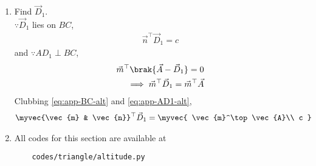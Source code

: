 \begin{enumerate}[label=\thesubsection.\arabic*.,ref=\thesubsection.\theenumi]
  \item Find $\vec{D}_1$.
	  \\
		\solution $\because \vec{D}_1$ lies on $BC$, 
\begin{align}
			\label{eq:app-BC-alt}
\vec{n}^\top\vec{D}_1 =c
\end{align}
and 
	$\because AD_1 \perp BC$,
\begin{align}
	\vec{m}^{\top}\brak{\vec{A}-\vec{D}_1} = 0
	\\
	\implies 
	\vec{m}^{\top}\vec{D}_1 = 
	\vec{m}^{\top}\vec{A}
			\label{eq:app-AD1-alt}
\end{align}
Clubbing
			\eqref{eq:app-BC-alt}
			and 
			\eqref{eq:app-AD1-alt},
\begin{align}
			\label{eq:app-D1-alt}
	\myvec{\vec{m} & \vec{n}}^\top\vec{D}_1 &= 
	   \myvec{
              \vec{m}^\top\vec{A}\\
	      c
	      }
\end{align}
\item 
All codes for this section are available at
\begin{lstlisting}
	codes/triangle/altitude.py
\end{lstlisting}
\end{enumerate}
